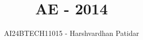 \documentclass[journal]{IEEEtran}
\begin{document}

\vspace{3cm}

\title{AE - 2014}
\author{AI24BTECH11015 - Harshvardhan Patidar}
 \maketitle
{\let\newpage\relax\maketitle}

\renewcommand{\thefigure}{\theenumi}
\renewcommand{\thetable}{\theenumi}
\setlength{\intextsep}{10pt} %


\renewcommand{\thetable}{\theenumi}
\end{document}
